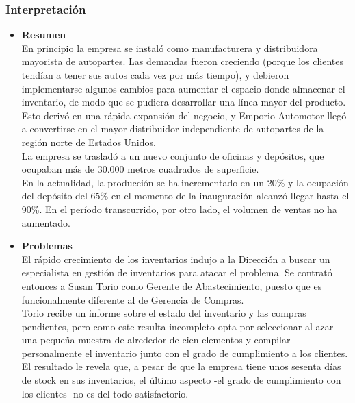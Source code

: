 \documentclass[a4paper,10pt,titlepage]{article}
\begin{document}
\subsubsection {Interpretaci\'on}
\begin{itemize}
 \item \textbf{Resumen}\\

En principio la empresa se instal\'o como manufacturera y distribuidora mayorista de autopartes. Las demandas fueron creciendo (porque los clientes tend\'ian a tener 
sus autos cada vez por m\'as tiempo), y debieron implementarse algunos cambios para aumentar el espacio donde almacenar el inventario, de modo que se pudiera 
desarrollar una l\'inea mayor del producto. Esto deriv\'o en una r\'apida expansi\'on del negocio, y Emporio Automotor lleg\'o a convertirse en el mayor distribuidor 
independiente de autopartes de la regi\'on norte de Estados Unidos.\\

La empresa se traslad\'o a un nuevo conjunto de oficinas y dep\'ositos, que ocupaban m\'as de 30.000 metros cuadrados de superficie.\\

En la actualidad, la producci\'on se ha incrementado en un 20\% y la ocupaci\'on del dep\'osito del 65\% en el momento de la inauguraci\'on alcanz\'o llegar hasta el 90\%. 
En el per\'iodo transcurrido, por otro lado, el volumen de ventas no ha aumentado.\\


\item \textbf{Problemas}\\

El r\'apido crecimiento de los inventarios indujo a la Direcci\'on a buscar un especialista en gesti\'on de inventarios para atacar el problema. Se contrat\'o entonces a 
Susan Torio como Gerente de Abastecimiento, puesto que es funcionalmente diferente al de Gerencia de Compras.\\

Torio recibe un informe sobre el estado del inventario y las compras pendientes, pero como este resulta incompleto opta por seleccionar al azar una pequeña muestra 
de alrededor de cien elementos y compilar personalmente el inventario junto con el grado de cumplimiento a los clientes. El resultado le revela que, a pesar de que la 
empresa tiene unos sesenta d\'ias de stock en sus inventarios, el \'ultimo aspecto -el grado de cumplimiento con los clientes- no es del todo satisfactorio.\\

\end{itemize}
\newpage
\end{document}
